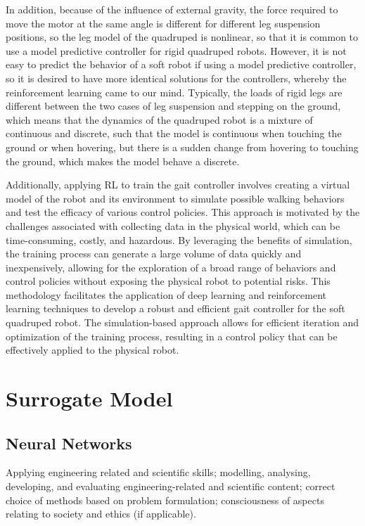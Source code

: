 In addition, because of the influence of external gravity, the force required to move the motor at the same angle is different for different leg suspension positions, so the leg model of the quadruped is nonlinear, so that it is common to use a model predictive controller for rigid quadruped robots. However, it is not easy to predict the behavior of a soft robot if using a model predictive controller\cite{bemporadLinearTimevaryingNonlinear2022}, so it is desired to have more identical solutions for the controllers, whereby the  reinforcement learning came to our mind\cite{hewingLearningbasedModelPredictive2020}. Typically, the loads of rigid legs are different between the two cases of leg suspension and stepping on the ground\cite{biswalDevelopmentQuadrupedWalking2021}, which means that the dynamics of the quadruped robot is a mixture of continuous and discrete, such that the model is continuous when touching the ground or when hovering, but there is a sudden change from hovering to touching the ground, which makes the model behave a discrete. 

Additionally, applying \ac{RL} to train the gait controller involves creating a virtual model of the robot and its environment to simulate possible walking behaviors and test the efficacy of various control policies. This approach is motivated by the challenges associated with collecting data in the physical world, which can be time-consuming, costly, and hazardous. By leveraging the benefits of simulation, the training process can generate a large volume of data quickly and inexpensively, allowing for the exploration of a broad range of behaviors and control policies without exposing the physical robot to potential risks. This methodology facilitates the application of deep learning and reinforcement learning techniques to develop a robust and efficient gait controller for the soft quadruped robot. The simulation-based approach allows for efficient iteration and optimization of the training process, resulting in a control policy that can be effectively applied to the physical robot.

\section{Surrogate Model}

\subsection{Neural Networks}

Applying engineering related and scientific skills; modelling, analysing, developing, and evaluating engineering-related and scientific content; correct choice of methods based on problem formulation; consciousness of aspects relating to society and ethics (if applicable).

